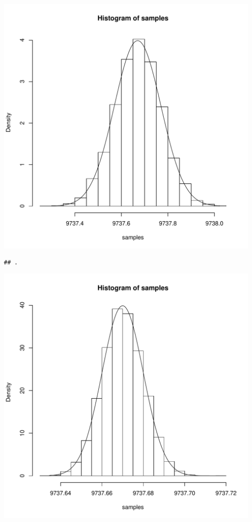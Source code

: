 \documentclass{llncs}\usepackage[]{graphicx}\usepackage[]{color}
\makeatletter
\def\maxwidth{ %
  \ifdim\Gin@nat@width>\linewidth
    \linewidth
  \else
    \Gin@nat@width
  \fi
}
\newenvironment{kframe}{%
 \def\at@end@of@kframe{}%
 \ifinner\ifhmode%
  \def\at@end@of@kframe{\end{minipage}}%
  \begin{minipage}{\columnwidth}%
 \fi\fi%
 \def\FrameCommand##1{\hskip\@totalleftmargin \hskip-\fboxsep
 \colorbox{shadecolor}{##1}\hskip-\fboxsep
     \hskip-\linewidth \hskip-\@totalleftmargin \hskip\columnwidth}%
 \MakeFramed {\advance\hsize-\width
   \@totalleftmargin\z@ \linewidth\hsize
   \@setminipage}}%
 {\par\unskip\endMakeFramed%
 \at@end@of@kframe}
\newenvironment{knitrout}{}{} %
\makeatother
\begin{document}
\begin{knitrout}
\begin{kframe}
{\ttfamily\noindent\color{warningcolor}{\#\# Warning in ks.test(samples, true\_cdf, ...): ties should not be present for the Kolmogorov-Smirnov test}}\end{kframe}
\includegraphics[width=\maxwidth]{figure/Rt-17} 
\begin{kframe}\begin{lstlisting}[basicstyle=\ttfamily,breaklines=true]
## .
\end{lstlisting}
\end{kframe}
\includegraphics[width=\maxwidth]{figure/Rt-18} 

\end{knitrout}
\end{document}
